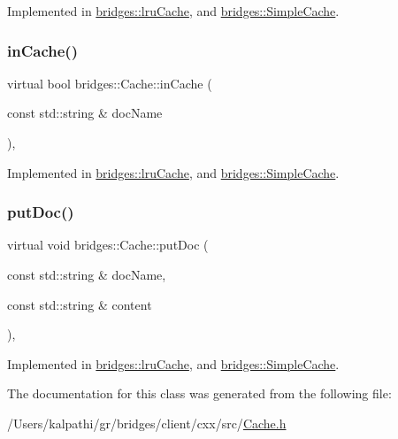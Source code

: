 Implemented in \mbox{\hyperlink{classbridges_1_1lru_cache_ac8bed8ab7cbf002a23573c071ba04ad6}{bridges\+::lru\+Cache}}, and \mbox{\hyperlink{classbridges_1_1_simple_cache_a905ad2e7fb1b6784a5f70caf024b157f}{bridges\+::\+Simple\+Cache}}.

\mbox{\label{classbridges_1_1_cache_abf3601225841d14dcd5611cd6a223ba4}} 
\subsubsection{\texorpdfstring{in\+Cache()}{inCache()}}
{\footnotesize\ttfamily virtual bool bridges\+::\+Cache\+::in\+Cache (\begin{DoxyParamCaption}\item[{const std\+::string \&}]{doc\+Name }\end{DoxyParamCaption})\hspace{0.3cm}{\ttfamily [pure virtual]}, {\ttfamily [noexcept]}}



Implemented in \mbox{\hyperlink{classbridges_1_1lru_cache_ab56c75166ddcc3d17e6924e581f7a4e8}{bridges\+::lru\+Cache}}, and \mbox{\hyperlink{classbridges_1_1_simple_cache_a9af328045bad7c3bd4ed6cf99352bf07}{bridges\+::\+Simple\+Cache}}.

\mbox{\label{classbridges_1_1_cache_ae74225542568a377fdcaf0354e466954}} 
\subsubsection{\texorpdfstring{put\+Doc()}{putDoc()}}
{\footnotesize\ttfamily virtual void bridges\+::\+Cache\+::put\+Doc (\begin{DoxyParamCaption}\item[{const std\+::string \&}]{doc\+Name,  }\item[{const std\+::string \&}]{content }\end{DoxyParamCaption})\hspace{0.3cm}{\ttfamily [pure virtual]}, {\ttfamily [noexcept]}}



Implemented in \mbox{\hyperlink{classbridges_1_1lru_cache_a927fa1186ba830717ce11898c2beb4c7}{bridges\+::lru\+Cache}}, and \mbox{\hyperlink{classbridges_1_1_simple_cache_a61264b1080a4458d6210c7cf6b4e8615}{bridges\+::\+Simple\+Cache}}.



The documentation for this class was generated from the following file\+:\begin{DoxyCompactItemize}
\item 
/\+Users/kalpathi/gr/bridges/client/cxx/src/\mbox{\hyperlink{_cache_8h}{Cache.\+h}}\end{DoxyCompactItemize}
